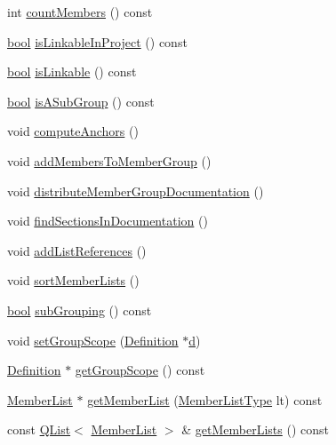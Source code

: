 \begin{DoxyCompactItemize}
int \hyperlink{class_group_def_a335801f73243e32f3d09ff4e7e1c6ec9}{count\+Members} () const 
\item 
\hyperlink{qglobal_8h_a1062901a7428fdd9c7f180f5e01ea056}{bool} \hyperlink{class_group_def_a98828f19954df2fbc8ca02df434edab2}{is\+Linkable\+In\+Project} () const 
\item 
\hyperlink{qglobal_8h_a1062901a7428fdd9c7f180f5e01ea056}{bool} \hyperlink{class_group_def_a9338f966e744542f22c5bbc630b80f95}{is\+Linkable} () const 
\item 
\hyperlink{qglobal_8h_a1062901a7428fdd9c7f180f5e01ea056}{bool} \hyperlink{class_group_def_abcfb1011f01f8f647770dd11cd2d1eb0}{is\+A\+Sub\+Group} () const 
\item 
void \hyperlink{class_group_def_a2b3099f398ccdb867feab801bcb970cd}{compute\+Anchors} ()
\item 
void \hyperlink{class_group_def_a48d0c12da606726845d4c8005127c57e}{add\+Members\+To\+Member\+Group} ()
\item 
void \hyperlink{class_group_def_a1b4853a1afc605da80f743dfee17b48e}{distribute\+Member\+Group\+Documentation} ()
\item 
void \hyperlink{class_group_def_a66bdfe8ee9631c175ba9433829c0e0a6}{find\+Sections\+In\+Documentation} ()
\item 
void \hyperlink{class_group_def_acef94f92bb7f07b5c8dc03bcfdd7f5b0}{add\+List\+References} ()
\item 
void \hyperlink{class_group_def_af29c5742610869db222c9b093c7fecfd}{sort\+Member\+Lists} ()
\item 
\hyperlink{qglobal_8h_a1062901a7428fdd9c7f180f5e01ea056}{bool} \hyperlink{class_group_def_a1190110bd63e95b9b6446f34c4de3411}{sub\+Grouping} () const 
\item 
void \hyperlink{class_group_def_a1d2494fa72857a2328ee5787f03f61a7}{set\+Group\+Scope} (\hyperlink{class_definition}{Definition} $\ast$\hyperlink{060__command__switch_8tcl_af43f4b1f0064a33b2d662af9f06d3a00}{d})
\item 
\hyperlink{class_definition}{Definition} $\ast$ \hyperlink{class_group_def_a4cf4c07f546d7712b36981ddcf420b9f}{get\+Group\+Scope} () const 
\item 
\hyperlink{class_member_list}{Member\+List} $\ast$ \hyperlink{class_group_def_a5a1cb52106104c2051f39ba15c0fccf1}{get\+Member\+List} (\hyperlink{types_8h_abe8ad5992f8938a28f918f51b199aa19}{Member\+List\+Type} lt) const 
\item 
const \hyperlink{class_q_list}{Q\+List}$<$ \hyperlink{class_member_list}{Member\+List} $>$ \& \hyperlink{class_group_def_a5da7a22183cb5c1ade6c6f475c7af596}{get\+Member\+Lists} () const 

\end{DoxyCompactItemize}
